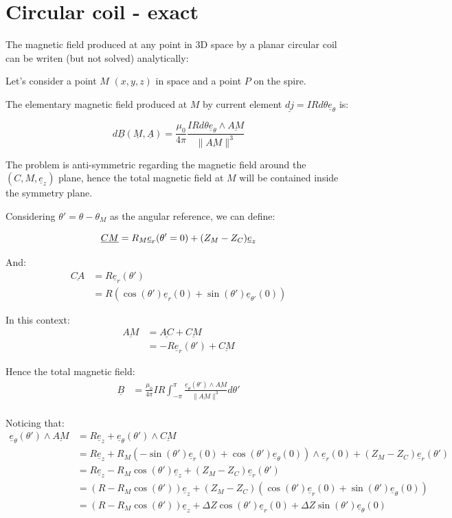 \documentclass[a4paper,11pt,twoside,titlepage,openright]{book}
\numberwithin{equation}{section}
\newcommand{\ud}[1]{\underline{#1}}
\begin{document}
\chapter{Circular coil - exact}
\label{chap:CircularCoilExact}

The magnetic field produced at any point in 3D space by a planar circular coil
can be writen (but not solved) analytically:

Let's consider a point $M$ $(x, y, z)$ in space and a point $P$ on the spire.

The elementary magnetic field produced at $M$ by current element $\ud{dj}
=IRd\theta\ud{e}_{\theta}$ is:

$$
d\ud{B}(\ud{M}, \ud{A}) = \frac{\mu_0}{4\pi}
\frac{IRd\theta\ud{e}_{\theta}\wedge\ud{AM}}
{\| \ud{AM} \|^3}
$$

The problem is anti-symmetric regarding the magnetic field around the $(C, M,
\ud{e}_z)$ plane, hence the total magnetic field at $M$ will be contained
inside the symmetry plane.

Considering $\theta' = \theta - \theta_{M}$ as the angular reference, we can
define:

$$                                                                              
\ud{CM} = R_M\ud{e}_r(\theta'=0) + (Z_M-Z_C)\ud{e}_z\\
$$

And:
$$
\begin{array}{ll}
    \ud{CA}
    & = R\ud{e}_r(\theta')\\
    & = R(\cos(\theta')\ud{e}_r(0) + \sin(\theta')\ud{e}_{\theta'}(0))
\end{array}
$$ 

In this context:
$$
\begin{array}{ll}
    \ud{AM}
    & = \ud{AC} + \ud{CM}\\
    & = -R\ud{e}_r(\theta') + \ud{CM}
\end{array}
$$

Hence the total magnetic field:
$$
\begin{array}{ll}
    \ud{B}
    & = \frac{\mu_0}{4\pi}IR
    \int_{-\pi}^{\pi}
    \frac{\ud{e}_{\theta}(\theta')\wedge\ud{AM}}{\| \ud{AM} \|^3}d\theta'\\
\end{array}
$$

Noticing that:
$$
\begin{array}{ll}
    \ud{e}_{\theta}(\theta')\wedge\ud{AM}
    & = R\ud{e}_z + \ud{e}_{\theta}(\theta')\wedge\ud{CM}\\
    & = R\ud{e}_z
    + R_M\left(-\sin(\theta')\ud{e}_r(0) + \cos(\theta')\ud{e}_{\theta}(0)\right)
    \wedge\ud{e}_r(0)
    + \left(Z_M-Z_C\right)\ud{e}_r(\theta')\\
    & = R\ud{e}_z
    - R_M\cos(\theta')\ud{e}_z
    + \left(Z_M-Z_C\right)\ud{e}_r(\theta')\\
    & = (R-R_M\cos(\theta'))\ud{e}_z
    + \left(Z_M-Z_C\right)(\cos(\theta')\ud{e}_r(0) + \sin(\theta')\ud{e}_{\theta}(0))\\
    & = (R-R_M\cos(\theta'))\ud{e}_z
    + \Delta Z\cos(\theta')\ud{e}_r(0) + \Delta Z\sin(\theta')\ud{e}_{\theta}(0)\\
\end{array}
$$
\end{document}
